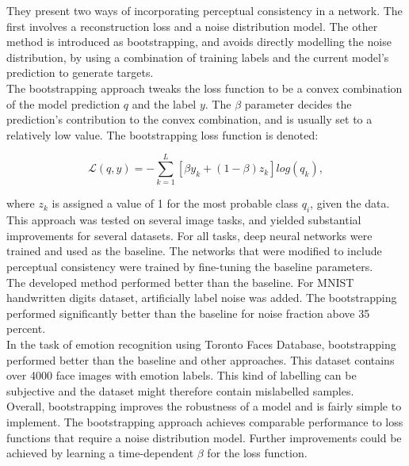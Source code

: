 They present two ways of incorporating perceptual consistency in a network. The first involves a reconstruction loss and a noise distribution model. The other method is introduced as bootstrapping, and avoids directly modelling the noise distribution, by using a combination of training labels and the current model's prediction to generate targets.\\

The bootstrapping approach tweaks the loss function to be a convex combination of the model prediction $q$ and the label $y$. The $\beta$ parameter decides the prediction's contribution to the convex combination, and is usually set to a relatively low value. The bootstrapping loss function is denoted:

$$\mathcal{L}(q,y) = - \sum\limits_{k=1}^L [\beta y_k + (1-\beta)z_k]log(q_k),$$

where $z_k$ is assigned a value of 1 for the most probable class $q_i$, given the data. \\

This approach was tested on several image tasks, and yielded substantial improvements for several datasets. For all tasks, deep neural networks were trained and used as the baseline. The networks that were modified to include perceptual consistency were trained by fine-tuning the baseline parameters. \\

The developed method performed better than the baseline. For MNIST handwritten digits dataset, artificially label noise was added. The bootstrapping performed significantly better than the baseline for noise fraction above 35 percent.\\

In the task of emotion recognition using Toronto Faces Database, bootstrapping performed better than the baseline and other approaches. This dataset contains over 4000 face images with emotion labels. This kind of labelling can be subjective and the dataset might therefore contain mislabelled samples. \\

Overall, bootstrapping improves the robustness of a model and is fairly simple to implement. The bootstrapping approach achieves comparable performance to loss functions that require a noise distribution model. Further improvements could be achieved by learning a time-dependent $\beta$ for the loss function.




